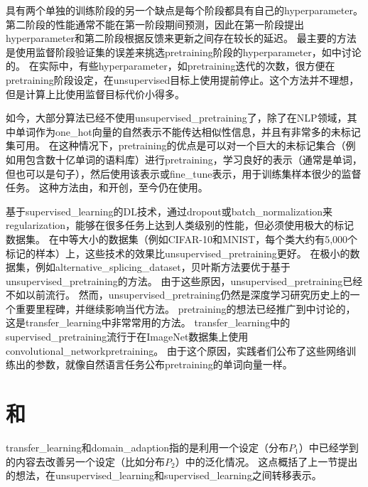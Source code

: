 具有两个单独的训练阶段的另一个缺点是每个阶段都具有自己的\gls{hyperparameter}。
第二阶段的性能通常不能在第一阶段期间预测，因此在第一阶段提出\gls{hyperparameter}和第二阶段根据反馈来更新之间存在较长的延迟。
最主要的方法是使用监督阶段验证集的误差来挑选\gls{pretraining}阶段的\gls{hyperparameter}，如\cite{Larochelle-jmlr-2009}中讨论的。
在实际中，有些\gls{hyperparameter}，如\gls{pretraining}迭代的次数，很方便在\gls{pretraining}阶段设定，在\gls{unsupervised}目标上使用提前停止。这个方法并不理想，但是计算上比使用监督目标代价小得多。


如今，大部分算法已经不使用\gls{unsupervised_pretraining}了，除了在\gls{NLP}领域，其中单词作为\gls{one_hot}向量的自然表示不能传达相似性信息，并且有非常多的未标记集可用。
在这种情况下，\gls{pretraining}的优点是可以对一个巨大的未标记集合（例如用包含数十亿单词的语料库）进行\gls{pretraining}，学习良好的表示（通常是单词，但也可以是句子），然后使用该表示或\gls{fine_tune}表示，用于训练集样本很少的监督任务。
这种方法由\cite{CollobertR2008-small}，\cite{Turian+Ratinov+Bengio-2010-small}和\cite{collobert2011natural}开创，至今仍在使用。


基于\gls{supervised_learning}的\gls{DL}技术，通过\gls{dropout}或\gls{batch_normalization}来\gls{regularization}，能够在很多任务上达到人类级别的性能，但必须使用极大的标记数据集。
在中等大小的数据集（例如CIFAR-10和MNIST，每个类大约有5,000个标记的样本）上，这些技术的效果比\gls{unsupervised_pretraining}更好。
在极小的数据集，例如\gls{alternative_splicing_dataset}，贝叶斯方法要优于基于\gls{unsupervised_pretraining}的方法\citep{Srivastava-master-small}。
由于这些原因，\gls{unsupervised_pretraining}已经不如以前流行。
然而，\gls{unsupervised_pretraining}仍然是深度学习研究历史上的一个重要里程碑，并继续影响当代方法。
\gls{pretraining}的想法已经推广到中讨论的，这是\gls{transfer_learning}中非常常用的方法。
\gls{transfer_learning}中的\gls{supervised_pretraining}流行\citep{Oquab-et-al-CVPR2014,yosinski-nips2014}于在ImageNet数据集上使用\gls{convolutional_network}\gls{pretraining}。
由于这个原因，实践者们公布了这些网络训练出的参数，就像自然语言任务公布\gls{pretraining}的单词向量一样\citep{collobert2011natural,Mikolov-et-al-ICLR2013}。


\section{和}
\label{sec:transfer_learning_and_domain_adaptation}
\gls{transfer_learning}和\gls{domain_adaption}指的是利用一个设定（分布$P_1$）中已经学到的内容去改善另一个设定（比如分布$P_2$）中的泛化情况。
这点概括了上一节提出的想法，在\gls{unsupervised_learning}和\gls{supervised_learning}之间转移表示。


